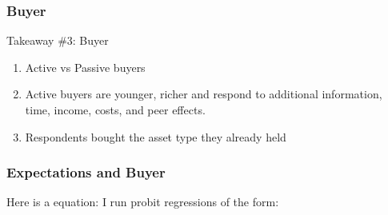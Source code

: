 \documentclass[pdflatex]{beamer}
\begin{document}
\begin{frame}
	\frametitle{Buyer}
	\begin{block}{Takeaway \#3: Buyer}
		{
			\begin{enumerate}
				\item Active vs Passive buyers
				\item Active buyers are younger, richer and respond to additional information, time, income, costs, and peer effects.
				\item Respondents bought the asset type they already held
			\end{enumerate}
		}
	\end{block}
\end{frame}

\begin{frame}
	\frametitle{Expectations and Buyer}
	Here is a equation:
	I run probit regressions of the form:
	
\end{frame}
\end{document}
